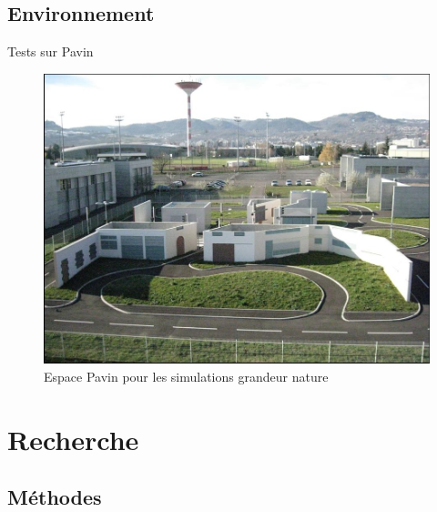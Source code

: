 \documentclass{beamer}
\begin{document}
\subsection*{Environnement}
\begin{frame}{Tests sur Pavin}

  \begin{figure}
    \includegraphics[width=0.7\linewidth]{images/pavin.jpg}
    \caption{Espace Pavin pour les simulations grandeur nature}
  \end{figure}
\end{frame}


\section{Recherche}
\subsection*{Méthodes}
\end{document}
